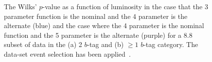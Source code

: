 \begin{figure}[!ht]
  \begin{center}
    \captionsetup[subfigure]{aboveskip=0pt,justification=centering}
  \end{center} 
  \caption[The Wilks' \mbox{$p$-value} as a function of luminosity for a 8.8~\ifb{} subset of \summer{}
     data-set in the (a) 2 $b$-tag and (b) $\geq1$ $b$-tag category.]
          {The Wilks' \mbox{$p$-value} as a function of luminosity
            in the case that the 3 parameter function is the nominal and the 4 parameter is the alternate (blue)
            and the case where the 4 parameter is the nominal function and the 5 parameter is the alternate (purple)
            for a 8.8~\ifb{} subset of data in the (a) 2 $b$-tag and (b) $\geq1$ $b$-tag category.
            The \summer{} data-set event selection has been applied~\cite{dibjet-ichep_conf}.
  }
  \label{fig:bkg-summer-wilks}
\end{figure}

